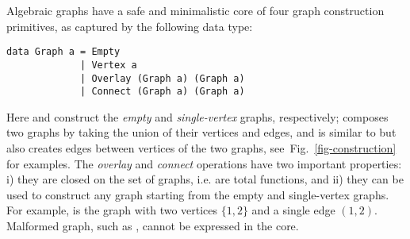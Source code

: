 Algebraic graphs have a safe and minimalistic core of four graph construction primitives,
as captured by the following data type:

\begin{verbatim}
data Graph a = Empty
             | Vertex a
             | Overlay (Graph a) (Graph a)
             | Connect (Graph a) (Graph a)
\end{verbatim}

\noindent
Here  and  construct the \emph{empty} and \emph{single-vertex} graphs,
respectively;  composes two graphs by taking the union of their vertices and
edges, and  is similar to  but also creates edges between vertices
of the two graphs, see~Fig.~\ref{fig-construction} for examples. The \emph{overlay} and
\emph{connect} operations have two important properties:
i) they are closed on the set of graphs, i.e. are total functions, and ii) they can be used
to construct any graph starting from the empty and single-vertex graphs.
For example,  is the graph with two vertices $\{1,2\}$
and a single edge $(1,2)$. Malformed graph, such as , cannot be
expressed in the core.

